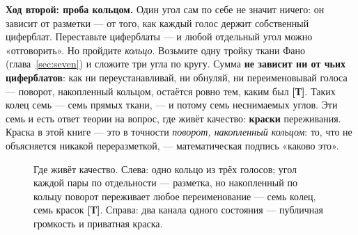 \documentclass[11pt,letterpaper]{article}
\newcommand{\stT}{\textbf{[Т]}\xspace}
\begin{document}
\textbf{Ход второй: проба кольцом.} Один угол сам по себе не значит
ничего: он зависит от разметки --- от того, как каждый голос держит
собственный циферблат. Переставьте циферблаты --- и любой отдельный
угол можно «отговорить». Но пройдите \emph{кольцо}. Возьмите одну
тройку ткани Фано (глава~\ref{sec:seven}) и сложите три угла по
кругу. Сумма \textbf{не зависит ни от чьих циферблатов}: как ни
переустанавливай, ни обнуляй, ни переименовывай голоса --- поворот,
накопленный кольцом, остаётся ровно тем, каким был \stT. Таких колец
семь --- семь прямых ткани, --- и потому семь неснимаемых углов.
Эти семь и есть ответ теории на вопрос, где живёт качество:
\textbf{краски} переживания. Краска в этой книге --- это в точности
\emph{поворот, накопленный кольцом}: то, что не объясняется никакой
переразметкой, --- математическая подпись «каково это».

\begin{figure}[H]
\centering
{}
\caption{Где живёт качество. Слева: одно кольцо из трёх голосов;
угол каждой пары по отдельности --- разметка, но накопленный по
кольцу поворот переживает любое переименование --- семь колец, семь
красок \stT. Справа: два канала одного состояния --- публичная
громкость и приватная краска.}
\label{fig:ring}
\end{figure}
\end{document}
